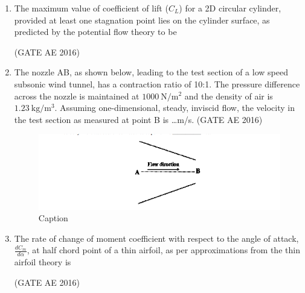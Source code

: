 \documentclass[journal,12pt,onecolumn]{IEEEtran}
\theoremstyle{remark}
\begin{document}
\begin{enumerate}
\item The maximum value of coefficient of lift ($C_L$) for a 2D circular cylinder, provided at least one stagnation point lies on the cylinder surface, as predicted by the potential flow theory to be
\begin{enumerate}
\end{enumerate}
\hfill(GATE AE 2016)



\item The nozzle AB, as shown below, leading to the test section of a low speed subsonic wind tunnel, has a contraction ratio of 10:1. The pressure difference across the nozzle is maintained at $1000~\mathrm{N/m^2}$ and the density of air is $1.23~\mathrm{kg/m^3}$. Assuming one-dimensional, steady, inviscid flow, the velocity in the test section as measured at point B is \dots m/s.
\hfill(GATE AE 2016)

\begin{figure}[H]
    \centering
    \includegraphics[width=0.5\columnwidth]{figs/Screenshot from 2025-08-16 11-34-10.png}
    \caption{Caption}
    \label{fig:placeholder}
\end{figure}



\item The rate of change of moment coefficient with respect to the angle of attack, $\frac{dC_m}{d\alpha}$, at half chord point of a thin airfoil, as per approximations from the thin airfoil theory is
\begin{enumerate}
\end{enumerate}
\hfill(GATE AE 2016)




\end{enumerate}
\end{document}
